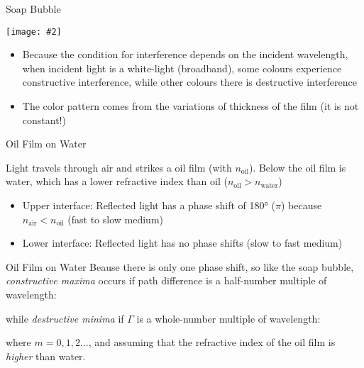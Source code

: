 \documentclass[12pt,compress,aspectratio=169]{beamer}
\newcommand{\pic}[2]{\texttt{[image: \#2]}}
\newcommand{\eq}[2]{\vspace{#1}{\LARGE\begin{displaymath}#2\end{displaymath}}}
\begin{document}
\begin{frame}{Soap Bubble}
  \begin{center}
    \pic{.45}{soap-bubble}
  \end{center}
  \begin{itemize}
  \item Because the condition for interference depends on the incident
    wavelength, when incident light is a white-light (broadband), some colours
    experience constructive interference, while other colours there is
    destructive interference
  \item The color pattern comes from the variations of thickness of the film
    (it is not constant!)
  \end{itemize}
\end{frame}



\begin{frame}{Oil Film on Water}
  \begin{center}
  \end{center}
  Light travels through air and strikes a oil film (with
  $n_\text{oil}$). Below the oil film is water, which has a lower refractive
  index than oil ($n_\text{oil}>n_\text{water}$)
  \begin{itemize}
  \item Upper interface: Reflected light has a phase shift of \ang{180} ($\pi$)
    because $n_\text{air}<n_\text{oil}$ (fast to slow medium)
  \item Lower interface: Reflected light has no phase shifts (slow to fast
    medium)
  \end{itemize}
\end{frame}



\begin{frame}{Oil Film on Water}
  Beause there is only one phase shift, so like the soap bubble,
  \emph{constructive maxima} occurs if path difference is a half-number
  multiple of wavelength:

  \eq{-.22in}{
    \boxed{
      \frac{2n_\text{oil}t}{\lambda}=m+\frac12
    }
  }

  while \emph{destructive minima} if $\Gamma$ is a whole-number multiple of
  wavelength:

  \eq{-.22in}{
    \boxed{
      \frac{2n_\text{oil}t}\lambda=m
    }
  }

  where $m=0,1,2\ldots$, and assuming that the refractive index of the oil
  film is \emph{higher} than water.
\end{frame}
\end{document}
